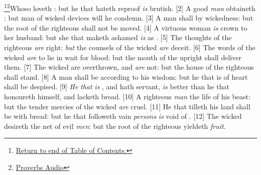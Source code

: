 \footnote{\textcolor[cmyk]{0.99998,1,0,0}{\hyperlink{TOC}{Return to end of Table of Contents.}}}\footnote{\href{https://audiobible.com/bible/proverbs_12.html}{\textcolor[cmyk]{0.99998,1,0,0}{Proverbs Audio}}}\textcolor[cmyk]{0.99998,1,0,0}{Whoso  loveth : but he that hateth reproof \emph{is} brutish.}
[2] \textcolor[cmyk]{0.99998,1,0,0}{A good \emph{man} obtaineth  : but  man of wicked devices will he condemn.}
[3] \textcolor[cmyk]{0.99998,1,0,0}{A man shall    by wickedness: but the root of the righteous shall not be moved.}
[4] \textcolor[cmyk]{0.99998,1,0,0}{A virtuous woman \emph{is}  crown to her husband: but she that maketh ashamed \emph{is} as .}
[5] \textcolor[cmyk]{0.99998,1,0,0}{The thoughts of the righteous \emph{are} right: \emph{but} the counsels of the wicked \emph{are} deceit.}
[6] \textcolor[cmyk]{0.99998,1,0,0}{The words of the wicked \emph{are} to lie in wait for blood: but the mouth of the upright shall deliver them.}
[7] \textcolor[cmyk]{0.99998,1,0,0}{The wicked are overthrown, and \emph{are} not: but the house of the righteous shall stand.}
[8] \textcolor[cmyk]{0.99998,1,0,0}{A man shall be  according to his wisdom: but he that is of   heart shall be despised.}
[9] \textcolor[cmyk]{0.99998,1,0,0}{\emph{He} \emph{that} \emph{is} , and hath  servant, \emph{is} better than he that honoureth himself, and lacketh bread.}
[10] \textcolor[cmyk]{0.99998,1,0,0}{A righteous \emph{man}  the life of his beast: but the tender mercies of the wicked \emph{are} cruel.}
[11] \textcolor[cmyk]{0.99998,1,0,0}{He that tilleth his land shall be  with bread: but he that followeth vain \emph{persons} \emph{is} void of .}
[12] \textcolor[cmyk]{0.99998,1,0,0}{The wicked desireth the net of evil \emph{men}: but the root of the righteous yieldeth \emph{fruit}.}
